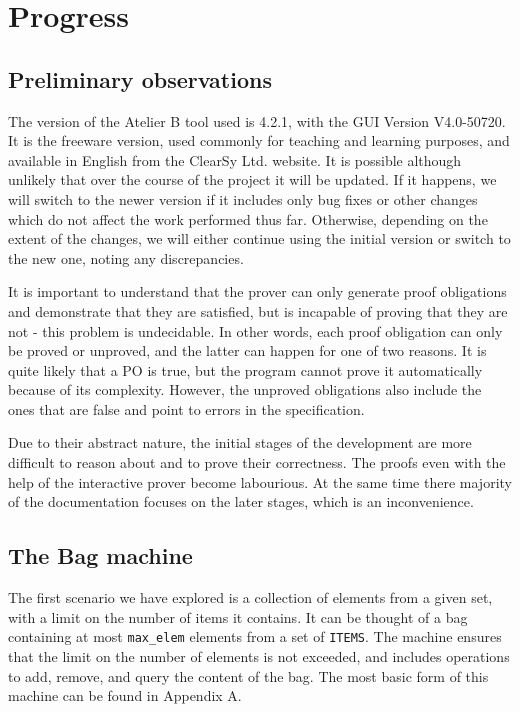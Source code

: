 \documentclass[11pt,journal]{IEEEtran}
\begin{document}
	
	\section{Progress}
	\subsection{Preliminary observations}
	The version of the Atelier B tool used is 4.2.1, with the GUI Version V4.0-50720. It is the freeware version, used commonly for teaching and learning purposes, and available in English from the ClearSy Ltd. website. It is possible although unlikely that over the course of the project it will be updated. If it happens, we will switch to the newer version if it includes only bug fixes or other changes which do not affect the work performed thus far. Otherwise, depending on the extent of the changes, we will either continue using the initial version or switch to the new one, noting any discrepancies.
	
	It is important to understand that the prover can only generate proof obligations and demonstrate that they are satisfied, but is incapable of proving that they are not - this problem is undecidable. In other words, each proof obligation can only be proved or unproved, and the latter can happen for one of two reasons. It is quite likely that a PO is true, but the program cannot prove it automatically because of its complexity. However, the unproved obligations also include the ones that are false and point to errors in the specification. 
	
	Due to their abstract nature, the initial stages of the development are more difficult to reason about and to prove their correctness. The proofs even with the help of the interactive prover become labourious. At the same time there majority of the documentation focuses on the later stages, which is an inconvenience. 
	
	\subsection{The Bag machine}
	The first scenario we have explored is a collection of elements from a given set, with a limit on the number of items it contains. It can be thought of a bag containing at most \texttt{max\_elem} elements from a set of \texttt{ITEMS}. The machine ensures that the limit on the number of elements is not exceeded, and includes operations to add, remove, and query the content of the bag. The most basic form of this machine can be found in Appendix A. 
	
\end{document}
